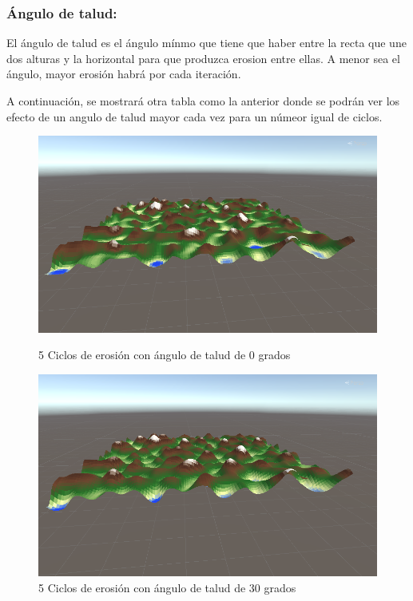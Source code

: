 \subsubsection{Ángulo de talud: }El ángulo de talud es el ángulo mínmo que tiene que haber entre la recta que une dos alturas y la horizontal para que produzca erosion entre ellas. A menor sea el ángulo, mayor erosión habrá por cada iteración.

A continuación, se mostrará otra tabla como la anterior donde se podrán ver los efecto de un angulo de talud mayor cada vez para un númeor igual de ciclos.
\begin{figure}[ht]
    \centering
    \begin{minipage}{0.45\textwidth}
        \centering
        \includegraphics[width=\textwidth]{img/talud0.png}
        \caption{5 Ciclos de erosión con ángulo de talud de 0 grados}
    \end{minipage}%
    \hfill
    \begin{minipage}{0.45\textwidth}
        \centering
        \includegraphics[width=\textwidth]{img/talud30.png}
        \caption{5 Ciclos de erosión con ángulo de talud de 30 grados}
    \end{minipage}
    

\end{figure}
